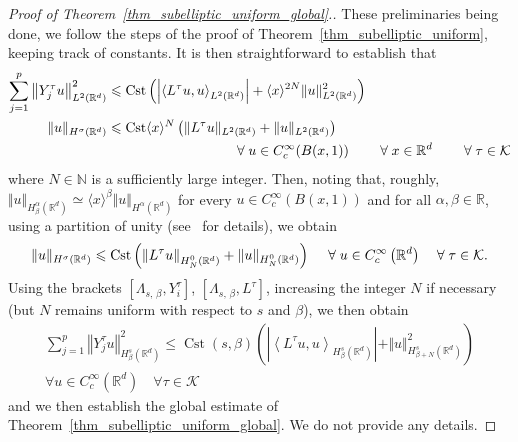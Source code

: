 \documentclass[10pt]{amsart}
\theoremstyle{definition}\newtheorem{defi}[theo]{Definition}\newtheorem{rema}[theo]{Remark}\newtheorem{exam}[theo]{Example}\newtheorem{exem}[theo]{Example}\newtheorem{nota}[theo]{Notation}
\newcommand*\R{\mathbb{R}}
\newcommand*\N{\mathbb{N}}
\newcommand{\calK}{\mathcal{K}}
\DeclareMathOperator{\Cst}{Cst}
\renewcommand{\leq}{\leqslant}
\let\oldforall\forall
\renewcommand*{\forall}{\mathrel{\oldforall}}
\begin{document}
\begin{proof}[Proof of Theorem~\ref{thm_subelliptic_uniform_global}.]
These preliminaries being done, we follow the steps of the proof of Theorem~\ref{thm_subelliptic_uniform}, keeping track of constants. It is then straightforward to establish that
\begin{align*}
 \sum_{j=1}^p \left\Vert Y_j^\tau u\right\Vert_{L^2\left(\R^d\right)}^2 &\leq \Cst \left(\left\vert\left\langle L^\tau u,u\right\rangle_{L^2\left(\R^d\right)}\right\vert + \langle x\rangle^{2N} \Vert u\Vert_{L^2\left(\R^d\right)}^2 \right) \\
\Vert u\Vert_{H^\sigma\left(\R^d\right)} &\leq \Cst \langle x\rangle^N \left(\Vert L^\tau u\Vert_{L^2\left(\R^d\right)} + \Vert u\Vert_{L^2\left(\R^d\right)} \right) \\
& \mkern165mu\forall u\in C_c^\infty(B(x,1))\qquad \forall x\in\R^d \qquad\forall \tau\in\calK
\end{align*}
where $N\in\N$ is a sufficiently large integer. Then, noting that, roughly, $\Vert u\Vert_{H^\alpha_\beta(\R^d)} \simeq \langle x\rangle^\beta\Vert u\Vert_{H^\alpha(\R^d)}$ for every $u\in C_c^\infty(B(x,1))$ and for all $\alpha,\beta\in\R$, using a partition of unity (see~\cite[Proof of Theorem~4.1]{EckmannHairer} for details), we obtain
\[
\Vert u\Vert_{H^\sigma\left(\R^d\right)} \leq \Cst \left(\left\Vert L^\tau u\right\Vert_{H^0_N\left(\R^d\right)} + \Vert u\Vert_{H^0_N\left(\R^d\right)} \right) \\
\quad \forall u\in C_c^\infty\left(\R^d\right) \quad\forall \tau\in\calK.
\]
Using the brackets $[\Lambda_{s,\,\beta},Y_i^\tau]$, $[\Lambda_{s,\,\beta},L^\tau]$, increasing the integer $N$ if necessary (but $N$ remains uniform with respect to $s$ and $\beta$), we then obtain
\begin{multline*}
\sum_{j=1}^p \left\Vert Y_j^\tau u\right\Vert_{H^s_\beta\left(\R^d\right)}^2 \leq \Cst(s,\beta) \left(\left\vert\left\langle L^\tau u,u\right\rangle_{H^s_\beta\left(\R^d\right)}\right\vert + \Vert u\Vert_{H^s_{\beta+N}\left(\R^d\right)}^2 \right) \\
\forall u\in C_c^\infty\left(\R^d\right) \quad\forall \tau\in\calK
\end{multline*}
and we then establish the global estimate of Theorem~\ref{thm_subelliptic_uniform_global}. We do not provide any details.
\end{proof}
\end{document}

